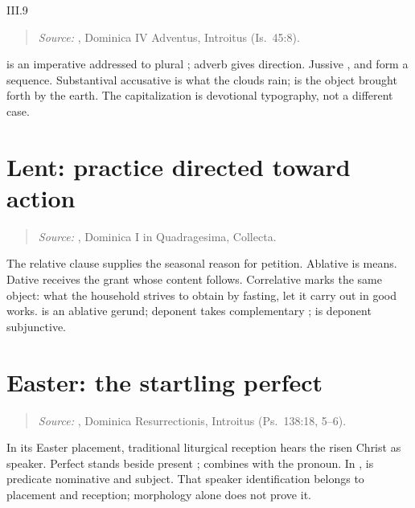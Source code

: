 \begin{courseunit}{III.9}
\begin{quote}
\emph{Source:} \Missal, Dominica IV Adventus, Introitus (Is.~45:8).
\end{quote}

 is an imperative addressed to plural ; adverb
 gives direction. Jussive , and
 form a sequence. Substantival accusative  is what
the clouds rain;  is the object brought forth by the earth.
The capitalization is devotional typography, not a different case.

\section{Lent: practice directed toward action}

\begin{quote}

\emph{Source:} \Missal, Dominica I in Quadragesima, Collecta.
\end{quote}

The relative clause supplies the seasonal reason for petition. Ablative
 is means. Dative
 receives the grant whose content follows. Correlative
 marks the same object: what the household strives to
obtain by fasting, let it carry out in good works.  is an
ablative gerund; deponent  takes complementary ;
 is deponent subjunctive.

\section{Easter: the startling perfect}

\begin{quote}

\emph{Source:} \Missal, Dominica Resurrectionis, Introitus (Ps.~138:18, 5--6).
\end{quote}

In its Easter placement, traditional liturgical reception hears the risen
Christ as speaker. Perfect  stands beside present ;
 combines  with the pronoun. In ,  is predicate nominative and  subject. That speaker identification belongs to placement and reception;
morphology alone does not prove it.


\end{courseunit}
